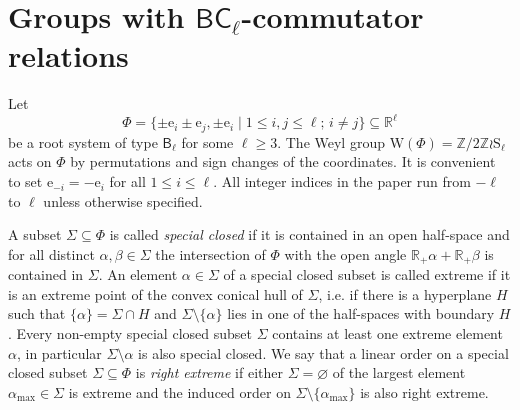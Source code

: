 \documentclass{article}
\theoremstyle{definition}
\begin{document}
\section{Groups with \(\mathsf{BC}_\ell\)-commutator relations}

Let \[
    \Phi = \{
        \pm \mathrm e_i \pm \mathrm e_j,
        \pm \mathrm e_i \mid
        1 \leq i, j \leq \ell;\,
        i \neq j
    \} \subseteq \mathbb R^\ell
\]
be a root system of type \(\mathsf B_\ell\) for some \(\ell \geq 3\). The Weyl group \(\mathrm W(\Phi) = \mathbb Z / 2 \mathbb Z \wr \mathrm S_\ell\) acts on \(\Phi\) by permutations and sign changes of the coordinates. It is convenient to set \(\mathrm e_{-i} = -\mathrm e_i\) for all \(1 \leq i \leq \ell\). All integer indices in the paper run from \(-\ell\) to \(\ell\) unless otherwise specified.

A subset \(\Sigma \subseteq \Phi\) is called \textit{special closed} if it is contained in an open half-space and for all distinct \(\alpha, \beta \in \Sigma\) the intersection of \(\Phi\) with the open angle \(\mathbb R_+ \alpha + \mathbb R_+ \beta\) is contained in \(\Sigma\). An element \(\alpha \in \Sigma\) of a special closed subset is called extreme if it is an extreme point of the convex conical hull of \(\Sigma\), i.e. if there is a hyperplane \(H\) such that \(\{\alpha\} = \Sigma \cap H\) and \(\Sigma \setminus \{\alpha\}\) lies in one of the half-spaces with boundary \(H\). Every non-empty special closed subset \(\Sigma\) contains at least one extreme element \(\alpha\), in particular \(\Sigma \setminus \alpha\) is also special closed. We say that a linear order on a special closed subset \(\Sigma \subseteq \Phi\) is \textit{right extreme} if either \(\Sigma = \varnothing\) of the largest element \(\alpha_{\mathrm{max}} \in \Sigma\) is extreme and the induced order on \(\Sigma \setminus \{\alpha_{\mathrm{max}}\}\) is also right extreme.
\end{document}
